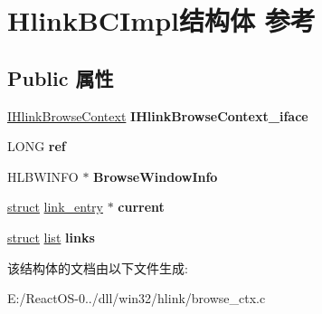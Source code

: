 \hypertarget{struct_hlink_b_c_impl}{}\section{Hlink\+B\+C\+Impl结构体 参考}
\label{struct_hlink_b_c_impl}
\subsection*{Public 属性}
\begin{DoxyCompactItemize}
\item 
\mbox{\label{struct_hlink_b_c_impl_ab1674bf377a4149ab292099930cbba72}} 
\hyperlink{interface_i_hlink_browse_context}{I\+Hlink\+Browse\+Context} {\bfseries I\+Hlink\+Browse\+Context\+\_\+iface}
\item 
\mbox{\label{struct_hlink_b_c_impl_abf48d615e28e401db51992167ca2b3ed}} 
L\+O\+NG {\bfseries ref}
\item 
\mbox{\label{struct_hlink_b_c_impl_a82c3462f7411ee1957751afe116f3f54}} 
H\+L\+B\+W\+I\+N\+FO $\ast$ {\bfseries Browse\+Window\+Info}
\item 
\mbox{\label{struct_hlink_b_c_impl_a5c4115265856aedecd0e107e47c931a6}} 
\hyperlink{interfacestruct}{struct} \hyperlink{structlink__entry}{link\+\_\+entry} $\ast$ {\bfseries current}
\item 
\mbox{\label{struct_hlink_b_c_impl_a415a2500bb87e47b28bab153f1f1b9af}} 
\hyperlink{interfacestruct}{struct} \hyperlink{classlist}{list} {\bfseries links}
\end{DoxyCompactItemize}


该结构体的文档由以下文件生成\+:\begin{DoxyCompactItemize}
\item 
E\+:/\+React\+O\+S-\/0../dll/win32/hlink/browse\+\_\+ctx.\+c\end{DoxyCompactItemize}
